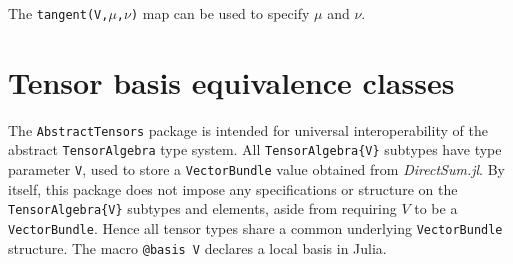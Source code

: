 \documentclass{juliacon}
\begin{document}
The \verb`tangent(V,`$\mu$\verb`,`$\nu$\verb`)` map can be used to specify $\mu$ and $\nu$.

\section{Tensor basis equivalence classes}%

The \verb`AbstractTensors` package is intended for universal interoperability of the abstract \verb`TensorAlgebra` type system.
All \verb`TensorAlgebra{V}` subtypes have type parameter \verb`V`, used to store a \verb`VectorBundle` value obtained from \textit{DirectSum.jl}.
By itself, this package does not impose any specifications or structure on the \verb`TensorAlgebra{V}` subtypes and elements, aside from requiring $V$ to be a \verb`VectorBundle`.
Hence all tensor types share a common underlying \verb`VectorBundle` structure.
The macro \verb`@basis V` declares a local basis in Julia.
\end{document}
